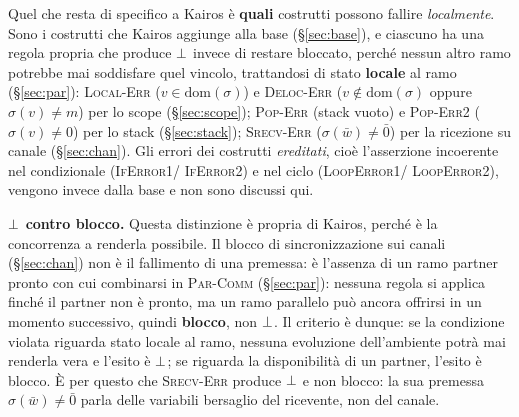 \medskip
\noindent
Quel che resta di specifico a Kairos è \textbf{quali} costrutti possono
fallire \emph{localmente}. Sono i costrutti che Kairos aggiunge alla base
(\S\ref{sec:base}), e ciascuno ha una regola propria che produce $\bot$ invece
di restare bloccato, perché nessun altro ramo potrebbe mai soddisfare quel
vincolo, trattandosi di stato \textbf{locale} al ramo (\S\ref{sec:par}):
\textcolor{red!60!black}{\textsc{Local-Err}} ($v \in \mathrm{dom}(\sigma)$) e
\textcolor{red!60!black}{\textsc{Deloc-Err}} ($v \notin \mathrm{dom}(\sigma)$
oppure $\sigma(v) \neq m$) per lo scope (\S\ref{sec:scope});
\textcolor{red!60!black}{\textsc{Pop-Err}} (stack vuoto) e
\textcolor{red!60!black}{\textsc{Pop-Err2}} ($\sigma(v) \neq 0$) per lo stack
(\S\ref{sec:stack}); \textcolor{red!60!black}{\textsc{Srecv-Err}}
($\sigma(\bar w) \neq \bar 0$) per la ricezione su canale (\S\ref{sec:chan}).
Gli errori dei costrutti \emph{ereditati}, cioè l'asserzione incoerente nel
condizionale (\textcolor{red!60!black}{\textsc{IfError1}}/%
\textcolor{red!60!black}{\textsc{IfError2}}) e nel ciclo
(\textcolor{red!60!black}{\textsc{LoopError1}}/%
\textcolor{red!60!black}{\textsc{LoopError2}}), vengono invece dalla base e
non sono discussi qui.

\medskip
\noindent
\textbf{$\bot$ contro blocco.} Questa distinzione è propria di Kairos, perché
è la concorrenza a renderla possibile. Il blocco di sincronizzazione sui
canali (\S\ref{sec:chan}) non è il fallimento di una premessa: è l'assenza di
un ramo partner pronto con cui combinarsi in \textsc{Par-Comm}
(\S\ref{sec:par}): nessuna regola si applica finché il partner non è pronto,
ma un ramo parallelo può ancora offrirsi in un momento successivo, quindi
\textbf{blocco}, non $\bot$. Il criterio è dunque: se la condizione violata
riguarda stato locale al ramo, nessuna evoluzione dell'ambiente potrà mai
renderla vera e l'esito è $\bot$; se riguarda la disponibilità di un partner,
l'esito è blocco. È per questo che
\textcolor{red!60!black}{\textsc{Srecv-Err}} produce $\bot$ e non blocco: la
sua premessa $\sigma(\bar w) \neq \bar 0$ parla delle variabili bersaglio del
ricevente, non del canale.

